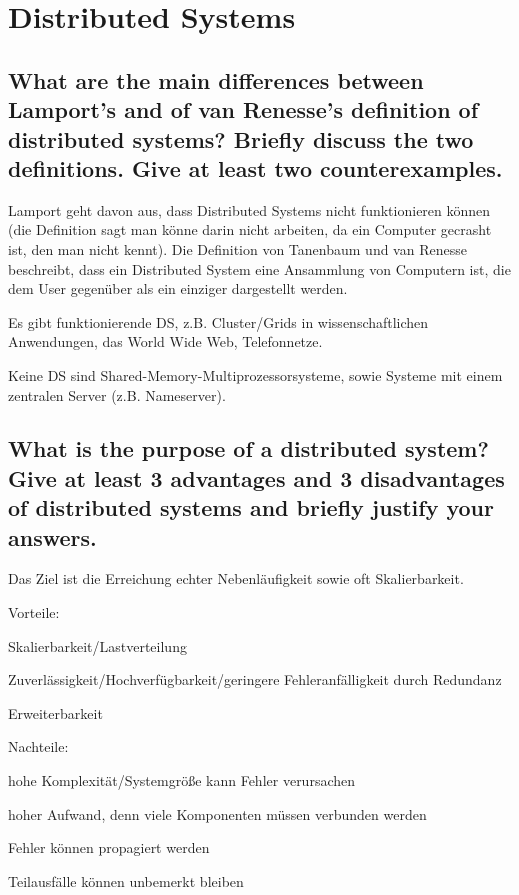\documentclass[a4paper,
			llpt,
			solution,
			accentcolor=tud2d,
			colorbacktitle
			]
			{tudexercise}
\begin{document}
\section{Distributed Systems}
\subsection{What are the main differences between Lamport’s and of van Renesse’s definition of distributed systems? Briefly discuss the two definitions. Give at least two counterexamples.}
Lamport geht davon aus, dass Distributed Systems nicht funktionieren können (die Definition sagt man könne darin nicht arbeiten, da ein Computer gecrasht ist, den man nicht kennt). Die Definition von Tanenbaum und van Renesse beschreibt, dass ein Distributed System eine Ansammlung von Computern ist, die dem User gegenüber als ein einziger dargestellt werden.

Es gibt funktionierende DS, z.B. Cluster/Grids in wissenschaftlichen Anwendungen, das World Wide Web, Telefonnetze.

Keine DS sind Shared-Memory-Multiprozessorsysteme, sowie Systeme mit einem zentralen Server (z.B. Nameserver).


\subsection{What is the purpose of a distributed system? Give at least 3 advantages and 3 disadvantages of distributed systems and briefly justify your answers.}
Das Ziel ist die Erreichung echter Nebenläufigkeit sowie oft Skalierbarkeit.

Vorteile:
\begin{compactitem}
\item Skalierbarkeit/Lastverteilung
\item Zuverlässigkeit/Hochverfügbarkeit/geringere Fehleranfälligkeit durch Redundanz
\item Erweiterbarkeit
\end{compactitem}

Nachteile:
\begin{compactitem}
	\item hohe Komplexität/Systemgröße kann Fehler verursachen
	\item hoher Aufwand, denn viele Komponenten müssen verbunden werden
	\item Fehler können propagiert werden
	\item Teilausfälle können unbemerkt bleiben
\end{compactitem}
\end{document}
